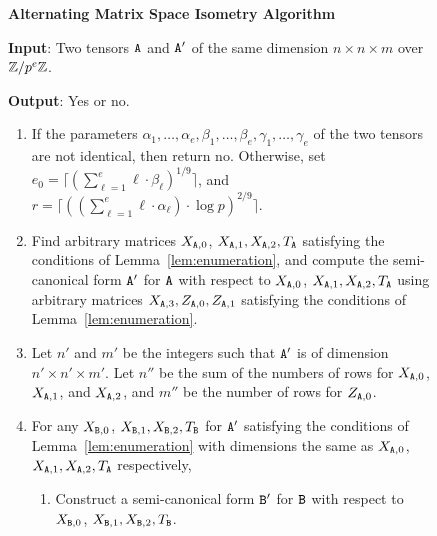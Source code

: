 \begin{figure}[th]

\begin{framed}
\noindent \textbf{Alternating Matrix Space Isometry Algorithm}

\noindent \textbf{Input}: Two tensors $\mathtt{A}$ and $\mathtt{A}'$ of the same dimension $n \times n \times m$ over $\mathbb{Z} / p^e \mathbb{Z}$.

\noindent \textbf{Output}: Yes or no.

\begin{enumerate}
\item If the parameters $\alpha_1, \dots, \alpha_e, \beta_1, \dots, \beta_e, \gamma_1, \dots, \gamma_e$ of the two tensors are not identical, then return no. 
Otherwise, set  $e_0 = \lceil (\sum_{\ell = 1}^{e} \ell \cdot \beta_\ell)^{1/9} \rceil$, and $r = \lceil ((\sum_{\ell = 1}^{e} \ell \cdot \alpha_\ell) \cdot \log p)^{2/9} \rceil$. 
\item Find arbitrary matrices $X_{\mathtt{A}, 0}$, $X_{\mathtt{A}, 1}, X_{\mathtt{A}, 2}, T_{\mathtt{A}}$ satisfying the conditions of Lemma~\ref{lem:enumeration}, and compute the semi-canonical form $\mathtt{A}'$ for $\mathtt{A}$ with respect to $X_{\mathtt{A}, 0}$, $X_{\mathtt{A}, 1}, X_{\mathtt{A}, 2}, T_{\mathtt{A}}$ using arbitrary matrices $X_{\mathtt{A}, 3}, Z_{\mathtt{A}, 0}, Z_{\mathtt{A}, 1}$ satisfying the conditions of Lemma~\ref{lem:enumeration}. 
\item 
Let $n'$ and $m'$ be the integers such that $\mathtt{A}'$ is of dimension $n' \times n' \times m'$.  
Let $n''$ be the sum of the numbers of rows for $X_{\mathtt{A}, 0}$, $X_{\mathtt{A}, 1}$, and $X_{\mathtt{A}, 2}$, and $m''$ be the number of rows for $Z_{\mathtt{A}, 0}$. 
\item For any $X_{\mathtt{B}, 0}$, $X_{\mathtt{B}, 1}, X_{\mathtt{B}, 2}, T_{\mathtt{B}}$ for $\mathtt{A}'$ satisfying the conditions of Lemma~\ref{lem:enumeration} with dimensions the same as $X_{\mathtt{A}, 0}$, $X_{\mathtt{A}, 1}, X_{\mathtt{A}, 2}, T_{\mathtt{A}}$ respectively,  
\begin{enumerate}
\item Construct a semi-canonical form $\mathtt{B}'$ for $\mathtt{B}$ with respect to $X_{\mathtt{B}, 0}$, $X_{\mathtt{B}, 1}, X_{\mathtt{B}, 2}, T_{\mathtt{B}}$. 

\end{enumerate}
\end{enumerate}
\end{framed}
\end{figure}
